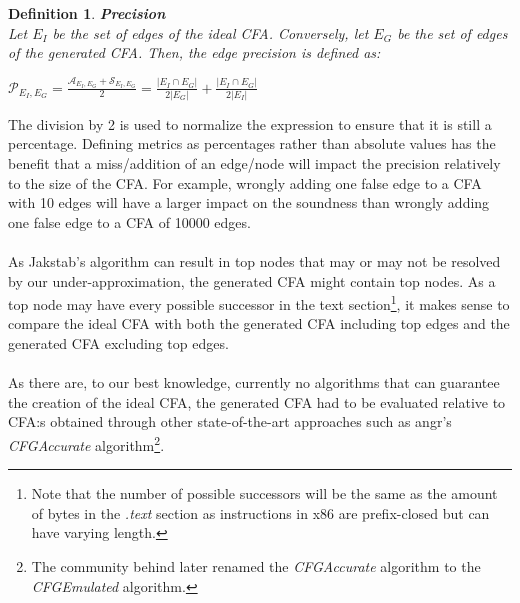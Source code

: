 \documentclass{kththesis}
\newtheorem*{definition}{Definition}
\renewcommand{\it}[1]{\textit{#1}}
\begin{document}
\begin{definition} \textbf{Precision}\\
Let $E_I$ be the set of edges of the ideal CFA. Conversely, let $E_G$ be the set of edges of the generated CFA. Then, the edge precision is defined as:
\begin{center}
$\mathcal{P}_{E_I,E_G} = \frac{\mathcal{A}_{E_I,E_G}+\mathcal{S}_{E_I,E_G}}{2} = \frac{|E_I \cap E_G|}{2|E_G|}+\frac{|E_I \cap E_G|}{2|E_I|}$
\end{center}
\end{definition}
\noindent
The division by 2 is used to normalize the expression to ensure that it is still a percentage. Defining metrics as percentages rather than absolute values has the benefit that a miss/addition of an edge/node will impact the precision relatively to the size of the CFA. For example, wrongly adding one false edge to a CFA with 10 edges will have a larger impact on the soundness than wrongly adding one false edge to a CFA of 10000 edges.
\\ \\
As Jakstab's algorithm can result in top nodes that may or may not be resolved by our under-approximation, the generated CFA might contain top nodes. As a top node may have every possible successor in the text section\footnote{Note that the number of possible successors will be the same as the amount of bytes in the \it{.text} section as instructions in x86 are prefix-closed but can have varying length.}, it makes sense to compare the ideal CFA with both the generated CFA including top edges and the generated CFA excluding top edges. 
\\ \\
As there are, to our best knowledge, currently no algorithms that can guarantee the creation of the ideal CFA, the generated CFA had to be evaluated relative to CFA:s obtained through other state-of-the-art approaches such as angr's \textit{CFGAccurate} algorithm\cite{angr}\footnote{The community behind  later renamed the \textit{CFGAccurate} algorithm to the \textit{CFGEmulated} algorithm.}.
\end{document}
